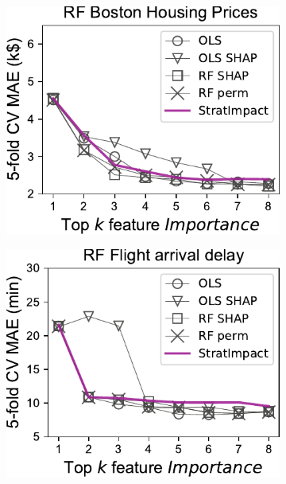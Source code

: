 \documentclass[11pt]{article}
\begin{document}
\begin{figure}
\centering
\begin{subfigure}{.245\textwidth}
    \centering
\includegraphics[scale=0.45]{images/boston-topk-RF-Importance.pdf}
\end{subfigure}%
\hfill
\begin{subfigure}{.245\textwidth}
    \centering
\includegraphics[scale=0.45]{images/flights-topk-RF-Importance.pdf}
\end{subfigure}
\hfill
\begin{subfigure}{.245\textwidth}

\end{subfigure}
\end{figure}
\end{document}

